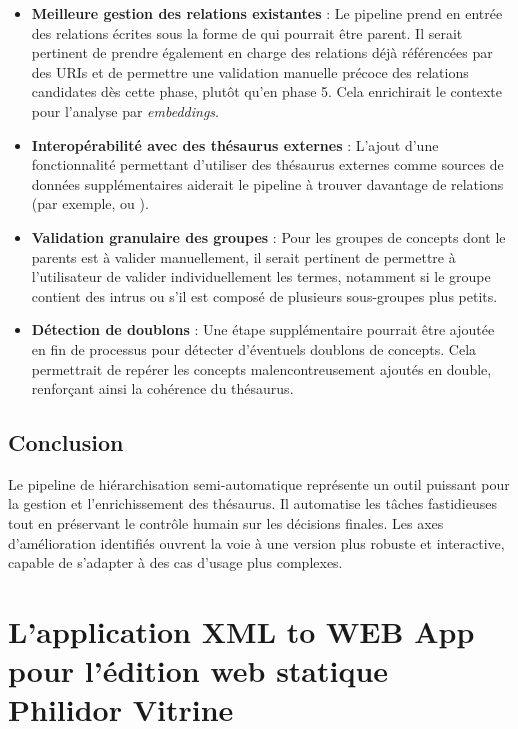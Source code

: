 \begin{itemize}
	\item \textbf{Meilleure gestion des relations existantes} : Le pipeline prend en entrée des relations écrites sous la forme de  qui pourrait être parent. Il serait pertinent de prendre également en charge des relations déjà référencées par des URIs et de permettre une validation manuelle précoce des relations candidates dès cette phase, plutôt qu'en phase 5. Cela enrichirait le contexte pour l'analyse par \textit{embeddings}.
	\item \textbf{Interopérabilité avec des thésaurus externes} : L'ajout d'une fonctionnalité permettant d'utiliser des thésaurus externes comme sources de données supplémentaires aiderait le pipeline à trouver davantage de relations (par exemple,  ou ).
	\item \textbf{Validation granulaire des groupes} : Pour les groupes de concepts dont le parents est à valider manuellement, il serait pertinent de permettre à l'utilisateur de valider individuellement les termes, notamment si le groupe contient des intrus ou s'il est composé de plusieurs sous-groupes plus petits.
	\item \textbf{Détection de doublons} : Une étape supplémentaire pourrait être ajoutée en fin de processus pour détecter d'éventuels doublons de concepts. Cela permettrait de repérer les concepts malencontreusement ajoutés en double, renforçant ainsi la cohérence du thésaurus.
\end{itemize}

\section*{Conclusion}

Le pipeline de hiérarchisation semi-automatique représente un outil puissant pour la gestion et l'enrichissement des thésaurus. Il automatise les tâches fastidieuses tout en préservant le contrôle humain sur les décisions finales. Les axes d'amélioration identifiés ouvrent la voie à une version plus robuste et interactive, capable de s'adapter à des cas d'usage plus complexes.

\chapter{L'application XML to WEB App pour l'édition web statique Philidor Vitrine} 
\label{xml_to_web_app}

